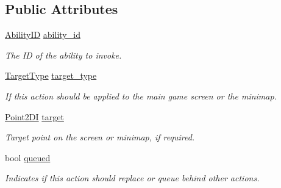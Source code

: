\subsection*{Public Attributes}
\begin{DoxyCompactItemize}
\item 
\mbox{\label{structsc2_1_1_spatial_unit_command_a305cc8a0fe2a1364ddb853c8b9a5583c}} 
\hyperlink{classsc2_1_1_s_c2_type}{Ability\+ID} \hyperlink{structsc2_1_1_spatial_unit_command_a305cc8a0fe2a1364ddb853c8b9a5583c}{ability\+\_\+id}
\begin{DoxyCompactList}\small\item\em The ID of the ability to invoke. \end{DoxyCompactList}\item 
\mbox{\label{structsc2_1_1_spatial_unit_command_a48ea9dd08e0f49f2899ed2c69f9ade16}} 
\hyperlink{structsc2_1_1_spatial_unit_command_ad50a0bbdbaff9ef68fbda3d817d3a32e}{Target\+Type} \hyperlink{structsc2_1_1_spatial_unit_command_a48ea9dd08e0f49f2899ed2c69f9ade16}{target\+\_\+type}
\begin{DoxyCompactList}\small\item\em If this action should be applied to the main game screen or the minimap. \end{DoxyCompactList}\item 
\mbox{\label{structsc2_1_1_spatial_unit_command_aaf33b1b6790e5f5af4509a5c28ef1a9c}} 
\hyperlink{structsc2_1_1_point2_d_i}{Point2\+DI} \hyperlink{structsc2_1_1_spatial_unit_command_aaf33b1b6790e5f5af4509a5c28ef1a9c}{target}
\begin{DoxyCompactList}\small\item\em Target point on the screen or minimap, if required. \end{DoxyCompactList}\item 
\mbox{\label{structsc2_1_1_spatial_unit_command_ae5cb8efec67b158fb1aaafd2491f38ea}} 
bool \hyperlink{structsc2_1_1_spatial_unit_command_ae5cb8efec67b158fb1aaafd2491f38ea}{queued}
\begin{DoxyCompactList}\small\item\em Indicates if this action should replace or queue behind other actions. \end{DoxyCompactList}\end{DoxyCompactItemize}


